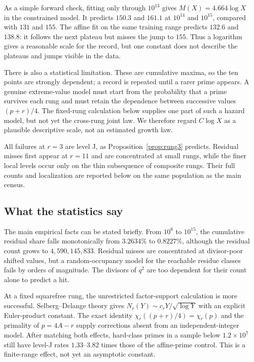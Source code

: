 \documentclass[11pt]{article}
\theoremstyle{definition}
\theoremstyle{remark}
\begin{document}
As a simple forward check, fitting only through $10^{13}$ gives
$M(X)=4.664\log X$ in the constrained model. It predicts $150.3$ and $161.1$ at
$10^{14}$ and $10^{15}$, compared with $131$ and $155$. The affine fit on the same
training range predicts $132.6$ and $138.8$: it follows the next plateau but misses the
jump to $155$. Thus a logarithm gives a reasonable scale for the record, but one
constant does not describe the plateaus and jumps visible in the data.

There is also a statistical limitation. These are cumulative maxima, so the ten points
are strongly dependent; a record is repeated until a rarer prime appears. A genuine
extreme-value model must start from the probability that a prime survives each rung and
must retain the dependence between successive values $(p+r)/4$. The fixed-rung
calculation below supplies one part of such a hazard model, but not yet the cross-rung
joint law. We therefore regard $C\log X$ as a plausible descriptive scale, not an
estimated growth law.

All failures at $r=3$ are level J, as Proposition~\ref{prop:rung3} predicts. Residual
misses first appear at $r=11$ and are concentrated at small rungs, while the finer local
levels occur only on the thin subsequence of composite rungs. Their full counts and
localization are reported below on the same population as the main census.

\subsection{What the statistics say}\label{sec:statistics}

The main empirical facts can be stated briefly. From $10^6$ to $10^{15}$, the
cumulative residual share falls monotonically from $3.2634\%$ to $0.8227\%$, although
the residual count grows to $4{,}590{,}145{,}833$. Residual misses are concentrated at
divisor-poor shifted values, but a random-occupancy model for the reachable residue
classes fails by orders of magnitude. The divisors of $q^2$ are too dependent for
their count alone to predict a hit.

At a fixed squarefree rung, the unrestricted factor-support calculation is more
successful. Selberg--Delange theory gives
$N_r(Y)\sim c_rY/\sqrt{\log Y}$ with an explicit Euler-product constant. The exact
identity
$\chi_r((p+r)/4)=\chi_r(p)$ and the primality of $p=4A-r$ supply corrections absent
from an independent-integer model. After matching both effects, hard-class primes in a
sample below $1.2\times10^7$ still have level-J rates $1.33$--$3.82$ times those of the
affine-prime control. This is a finite-range effect, not yet an asymptotic constant.
\end{document}
